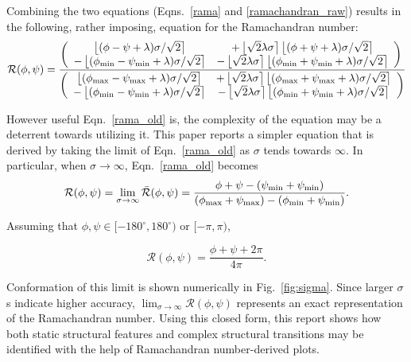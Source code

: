 \documentclass[fleqn,10pt,lineno]{wlpeerj} %
\newcommand{\round}[1]{\left \lfloor #1 \right \rceil }
\newcommand{\Fig}[1]{Fig.~\ref{#1}}
\newcommand{\Eqn}[1]{Eqn.~\ref{#1}}
\newcommand{\Eqns}[1]{Eqns.~\ref{#1}}
\begin{document}
Combining the two equations (\Eqns{rama} and \ref{ramachandran_raw}) results in the following, rather imposing, equation for the Ramachandran number:
\begin{equation}
{\mathcal{R}}(\phi,\psi) = 
\frac{
    \left(
	\begin{array}{c c}
	\round{(\phi - \psi + \lambda)\sigma/\sqrt{2}}  
	&    + \round{\sqrt{2} \lambda\sigma} \round{(\phi+\psi + \lambda)\sigma/\sqrt{2}} \\
		 - \round{(\phi_{\rm{min}} - \psi_{\rm{min}} + \lambda)\sigma/\sqrt{2}}  
	&    - \round{\sqrt{2} \lambda\sigma} \round{(\phi_{\rm{min}}+\psi_{\rm{min}} + \lambda)\sigma/\sqrt{2}}
	\end{array}
	\right)\\
 }{
    \left(
	\begin{array}{c c}
	\round{(\phi_{\rm{max}} - \psi_{\rm{max}} + \lambda)\sigma/\sqrt{2}}  
	& + \round{\sqrt{2} \lambda\sigma} \round{(\phi_{\rm{max}}+\psi_{\rm{max}} + \lambda)\sigma/\sqrt{2}}\\
	- \round{(\phi_{\rm{min}} - \psi_{\rm{min}} + \lambda)\sigma/\sqrt{2}}  
	& - \round{\sqrt{2} \lambda\sigma} \round{(\phi_{\rm{min}}+\psi_{\rm{min}} + \lambda)\sigma/\sqrt{2}}
	\end{array}
	\right)
} \label{rama_old}
\end{equation}

However useful \Eqn{rama_old} is, the complexity of the equation may be a deterrent towards utilizing it. This paper reports a simpler equation that is derived by taking the limit of \Eqn{rama_old} as $\sigma$ tends towards $\infty$. In particular, when $\sigma\to\infty$, \Eqn{rama_old} becomes
\begin{equation}
{\mathcal{R}}(\phi,\psi) = \lim_{\sigma\to\infty}{\bar{\mathcal{R}}}(\phi,\psi) = \frac{\phi+\psi-(\psi_{\rm min}+\psi_{\rm min})}{(\phi_{\rm max}+\psi_{\rm max})-(\phi_{\rm min}+\psi_{\rm min})}.
\label{ramaGeneral}
\end{equation}

Assuming that $\phi,\psi \in [-180^\circ,180^\circ)$ or $[-\pi,\pi)$,

\begin{equation}
\mathcal{R}(\phi,\psi) = \frac{\phi+\psi+2\pi}{4\pi}.
\label{rama2}
\end{equation}

Conformation of this limit is shown numerically in \Fig{fig:sigma}. Since larger $\sigma$s indicate higher accuracy, $\displaystyle\lim_{\sigma\to\infty}{\mathcal{R}}(\phi,\psi)$ represents an exact representation of the Ramachandran number. Using this closed form, this report shows how both static structural features and complex structural transitions may be identified with the help of Ramachandran number-derived plots.
\end{document}
